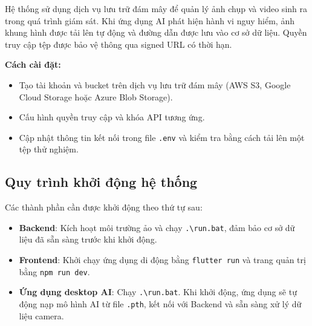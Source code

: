 Hệ thống sử dụng dịch vụ lưu trữ đám mây để quản lý ảnh chụp và video sinh ra trong quá trình giám sát.
Khi ứng dụng AI phát hiện hành vi nguy hiểm, ảnh khung hình được tải lên tự động và đường dẫn được lưu
vào cơ sở dữ liệu. Quyền truy cập tệp được bảo vệ thông qua signed URL có thời hạn.

\noindent\textbf{Cách cài đặt:}
\begin{itemize}
\item Tạo tài khoản và bucket trên dịch vụ lưu trữ đám mây (AWS S3, Google Cloud Storage
hoặc Azure Blob Storage).
\item Cấu hình quyền truy cập và khóa API tương ứng.
\item Cập nhật thông tin kết nối trong file \texttt{.env} và kiểm tra bằng cách tải lên
một tệp thử nghiệm.
\end{itemize}

\subsection{Quy trình khởi động hệ thống}

Các thành phần cần được khởi động theo thứ tự sau:

\begin{itemize}
\item \textbf{Backend}: Kích hoạt môi trường ảo và chạy
\texttt{.\textbackslash run.bat}, đảm bảo cơ sở dữ liệu đã sẵn sàng trước
khi khởi động.

\item \textbf{Frontend}: Khởi chạy ứng dụng di động bằng
\texttt{flutter run} và trang quản trị bằng
\texttt{npm run dev}.

\item \textbf{Ứng dụng desktop AI}: Chạy
\texttt{.\textbackslash run.bat}. Khi khởi động, ứng dụng sẽ tự động
nạp mô hình AI từ file \texttt{.pth}, kết nối với Backend và sẵn sàng
xử lý dữ liệu camera.

\end{itemize}
